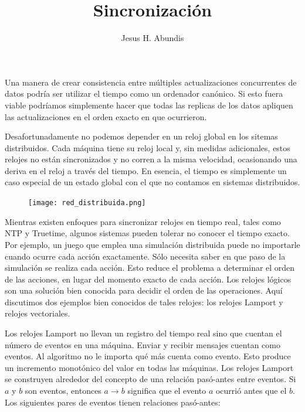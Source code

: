 \documentclass[12pt]{article}
\begin{document}
\title{Sincronización}
\author{Jesus H. Abundis}
\maketitle
\thispagestyle{empty}

\vspace{10pt}
Una manera de crear consistencia entre múltiples actualizaciones concurrentes de datos podría ser utilizar el tiempo como un ordenador canónico.
Si esto fuera viable podríamos simplemente hacer que todas las replicas de los datos apliquen las actualizaciones en el orden exacto en que ocurrieron.

Desafortunadamente no podemos depender en un reloj global en los sitemas distribuidos. 
Cada máquina tiene su reloj local y, 
sin medidas adicionales,
estos relojes no están sincronizados y no corren a la misma velocidad,
ocasionando una deriva en el reloj a través del tiempo.
En esencia, 
el tiempo es simplemente un caso especial de un estado global con el que no contamos en sistemas distribuidos.

\begin{figure}[h]
   \centering
   \texttt{[image: red\_distribuida.png]}
\end{figure}

Mientras existen enfoques para sincronizar relojes en tiempo real, 
tales como NTP y Truetime, 
algunos sistemas pueden tolerar no conocer el tiempo exacto.
Por ejemplo,
un juego que emplea una simulación distribuida puede no importarle cuando ocurre cada acción exactamente.
Sólo necesita saber en que paso de la simulación se realiza cada acción.
Esto reduce el problema a determinar el orden de las acciones,
en lugar del momento exacto de cada acción.
Los relojes lógicos son una solución bien conocida para decidir el orden de las operaciones. 
Aquí discutimos dos ejemplos bien conocidos de tales relojes:
los relojes Lamport y relojes vectoriales.

Los relojes Lamport no llevan un registro del tiempo real sino que cuentan el número de eventos en una máquina. 
Enviar y recibir mensajes cuentan como eventos.
Al algoritmo no le importa qué más cuenta como evento.
Esto produce un incremento monotónico del valor en todas las máquinas.
Los relojes Lamport se construyen alrededor del concepto de una relación pasó-antes entre eventos.
Si $a$ y $b$ son eventos, 
entonces $a \to b$ significa que el evento $a$ ocurrió antes que el $b$.
Los siguientes pares de eventos tienen relaciones pasó-antes:
\end{document}

